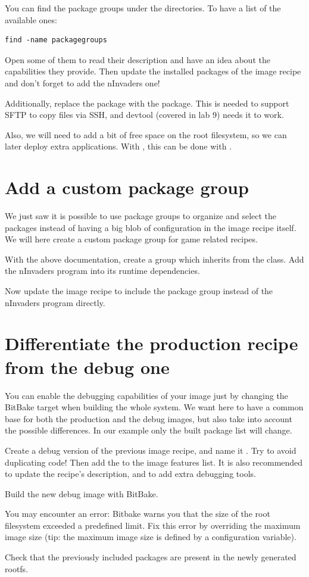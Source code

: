 You can find the package groups under the  directories. To
have a list of the available ones:
\begin{verbatim}
find -name packagegroups
\end{verbatim}

Open some of them to read their description and have an idea about the
capabilities they provide. Then update the installed packages of the image
recipe and don't forget to add the nInvaders one!

Additionally, replace the  package with
the  package. This is needed to
support SFTP to copy files via SSH, and devtool (covered in lab 9) needs it
to work.

\if{}
Also, we will need to add a bit of free space on the root filesystem, so we can
later deploy extra applications. With , this can be done
with .
\fi

\section{Add a custom package group}

We just saw it is possible to use package groups to organize and select the
packages instead of having a big blob of configuration in the image recipe
itself. We will here create a custom package group for game related recipes.

With the above documentation, create a  group
which inherits from the  class. Add the nInvaders program
into its runtime dependencies.

Now update the image recipe to include the package group instead of the
nInvaders program directly.

\section{Differentiate the production recipe from the debug one}

You can enable the debugging capabilities of your image just by changing the
BitBake target when building the whole system. We want here to have a common
base for both the production and the debug images, but also take into account the
possible differences. In our example only the built package list will change.

Create a debug version of the previous image recipe, and name it
. Try to avoid duplicating code! Then add the
 to the image features list. It is also recommended to
update the recipe's description, and to add extra debugging tools.

Build the new debug image with BitBake.

You may encounter an error: Bitbake warns you that the size of the root
filesystem exceeded a predefined limit. Fix this error by overriding the maximum
image size (tip: the maximum image size is defined by a configuration
variable).

Check that the previously included packages are present in the newly generated
rootfs.
